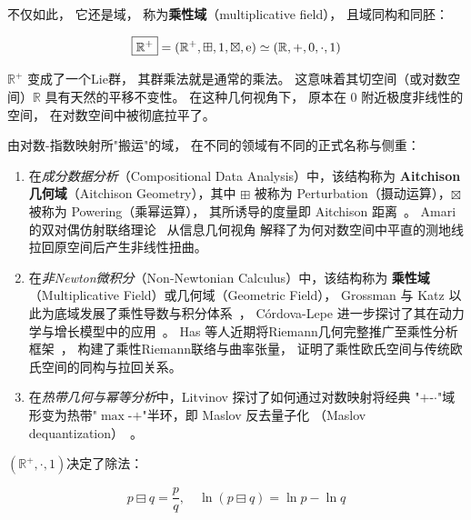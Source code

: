 ﻿\documentclass[10pt,a4paper]{article}
\newcommand{\sqplus}{\mathbin{\boxplus}}
\newcommand{\sqtimes}{\mathbin{\boxtimes}}
\newcommand{\sqminus}{\mathbin{\boxminus}}
\begin{document}
不仅如此，
它还是域，
称为\textbf{乘性域}（multiplicative field），
且域同构和同胚：

\begin{equation}
\boxed{\mathbb R^+} = (\mathbb R^+,\sqplus,1,\sqtimes,\text e)
\simeq
(\mathbb R,+,0,\cdot,1)
\label{eq:Multiplicative-Field}
\end{equation}

$\mathbb R^+$ 变成了一个Lie群，
其群乘法就是通常的乘法。
这意味着其切空间（或对数空间）$\mathbb R$ 具有天然的平移不变性。
在这种几何视角下，
原本在 $0$ 附近极度非线性的空间，
在对数空间中被彻底拉平了。

\begin{framed}

由对数-指数映射所"搬运"的域，
在不同的领域有不同的正式名称与侧重：
\begin{enumerate}
  \item 在\emph{成分数据分析}（Compositional Data Analysis）中，该结构称为
  \textbf{Aitchison 几何域}（Aitchison Geometry），其中 $\sqplus$
  被称为 Perturbation（摄动运算），$\sqtimes$ 被称为 Powering（乘幂运算），
  其所诱导的度量即 Aitchison 距离~\cite{Aitchison1986,PawlowskyGlahnEgozcue2001}。
  Amari 的双对偶仿射联络理论~\cite{Amari2016} 从信息几何视角
  解释了为何对数空间中平直的测地线拉回原空间后产生非线性扭曲。

  \item 在\emph{非Newton微积分}（Non-Newtonian Calculus）中，该结构称为
  \textbf{乘性域}（Multiplicative Field）或几何域（Geometric Field），
  Grossman 与 Katz 以此为底域发展了乘性导数与积分体系~\cite{GrossmanKatz1972}，
  Córdova-Lepe 进一步探讨了其在动力学与增长模型中的应用~\cite{CordovaLepe2006}。
  Has 等人近期将Riemann几何完整推广至乘性分析框架~\cite{Has2026}，
  构建了乘性Riemann联络与曲率张量，
  证明了乘性欧氏空间与传统欧氏空间的同构与拉回关系。

  \item 在\emph{热带几何与幂等分析}中，Litvinov 探讨了如何通过对数映射将经典
  "$+$-$\cdot$"域形变为热带"$\max$-$+$"半环，即 Maslov 反去量子化
  （Maslov dequantization）~\cite{Litvinov2007}。
\end{enumerate}

\end{framed}

$(\mathbb R^+,\cdot,1)$决定了除法：

\begin{equation*}
p \sqminus q = \frac{p}{q},\quad
\ln(p \sqminus q) = \ln p - \ln q
\end{equation*}
\end{document}
